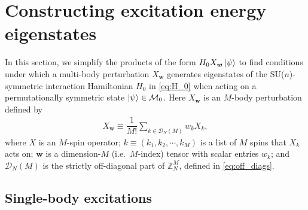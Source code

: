 \documentclass[nofootinbib,notitlepage,11pt]{revtex4-2}
\newcommand{\f}[2]{\dfrac{#1}{#2}} %
\newcommand{\p}[1]{\left(#1\right)} %
\newcommand{\m}{\bm} %
\newcommand{\1}{\mathds{1}}
\newcommand{\D}{\mathcal{D}}
\newcommand{\M}{\mathcal{M}}
\newcommand{\ZZ}{\mathbb{Z}}
\begin{document}
\section{Constructing excitation energy eigenstates}
\label{sec:eigenstates}

In this section, we simplify the products of the form
$H_0X_{\m w}\ket\psi$ to find conditions under which a multi-body
perturbation $X_{\m w}$ generates eigenstates of the SU($n$)-symmetric
interaction Hamiltonian $H_0$ in \eqref{eq:H_0} when acting on a
permutationally symmetric state $\ket\psi\in\M_0$.  Here $X_{\m w}$ is
an $M$-body perturbation defined by
\begin{align}
  X_{\m w}
  \equiv \f1{M!} \sum_{k\in\D_N\p{M}} w_k X_k,
\end{align}
where $X$ is an $M$-spin operator; $k\equiv\p{k_1,k_2,\cdots,k_M}$ is
a list of $M$ spins that $X_k$ acts on; $\m w$ is a dimension-$M$
(i.e.~$M$-index) tensor with scalar entries $w_k$; and $\D_N\p{M}$ is
the strictly off-diagonal part of $\ZZ_N^M$, defined in
\eqref{eq:off_diags}.

\subsection{Single-body excitations}
\label{sec:single_body_eigenstates}
\end{document}
